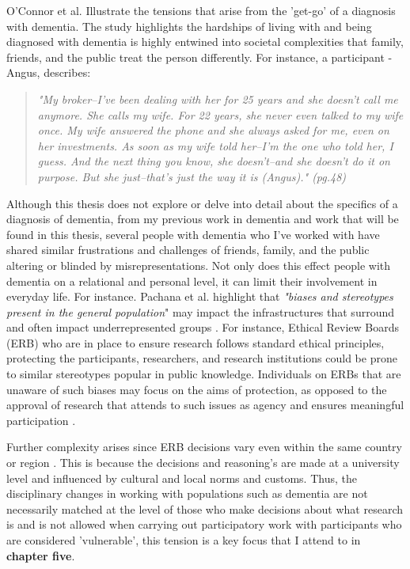 O'Connor et al. Illustrate the tensions that arise from the 'get-go' of a diagnosis with dementia. The study highlights the hardships of living with and being diagnosed with dementia is highly entwined into societal complexities that family, friends, and the public treat the person differently. For instance, a participant - Angus, describes:

\begin{quote}
\textit{"My broker–I've been dealing with her for 25 years and she doesn't call me anymore. She calls my wife. For 22 years, she never even talked to my wife once. My wife answered the phone and she always asked for me, even on her investments. As soon as my wife told her–I'm the one who told her, I guess. And the next thing you know, she doesn't–and she doesn't do it on purpose. But she just–that's just the way it is (Angus)." (pg.48) \citep{o2018stigma}}
\end{quote}

Although this thesis does not explore or delve into detail about the specifics of a diagnosis of dementia, from my previous work in dementia and work that will be found in this thesis, several people with dementia who I've worked with have shared similar frustrations and challenges of friends, family, and the public altering or blinded by misrepresentations. Not only does this effect people with dementia on a relational and personal level, it can limit their involvement in everyday life. For instance. Pachana et al. highlight that \textit{"biases and stereotypes present in the general population}" may impact the infrastructures that surround and often impact underrepresented groups \citep{pachana_can_2014}. For instance, Ethical Review Boards (ERB) who are in place to ensure research follows standard ethical principles, protecting the participants, researchers, and research institutions could be prone to similar stereotypes popular in public knowledge. Individuals on ERBs that are unaware of such biases may focus on the aims of protection, as opposed to the approval of research that attends to such issues as agency and ensures meaningful participation \citep{participants_back_2002}.

Further complexity arises since ERB decisions vary even within the same country or region \citep{edwards_research_2004}. This is because the decisions and reasoning's are made at a university level and influenced by cultural and local norms and customs. Thus, the disciplinary changes in working with populations such as dementia are not necessarily matched at the level of those who make decisions about what research is and is not allowed when carrying out participatory work with participants who are considered 'vulnerable', this tension is a key focus that I attend to in \textbf{chapter five}.

